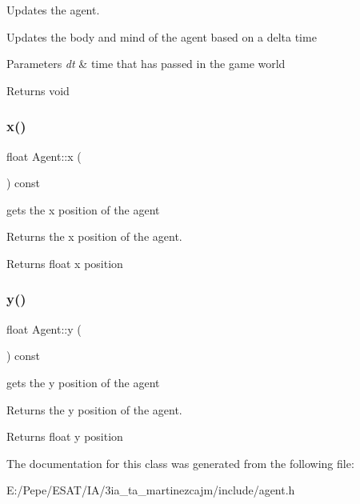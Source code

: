 Updates the agent. 

Updates the body and mind of the agent based on a delta time


\begin{DoxyParams}{Parameters}
{\em dt} & time that has passed in the game world \\
\hline
\end{DoxyParams}
\begin{DoxyReturn}{Returns}
void 
\end{DoxyReturn}
\mbox{\label{class_agent_a51aac7a6281e83d26d4c85475851cbf4}} 
\subsubsection{\texorpdfstring{x()}{x()}}
{\footnotesize\ttfamily float Agent\+::x (\begin{DoxyParamCaption}{ }\end{DoxyParamCaption}) const}



gets the x position of the agent 

Returns the x position of the agent.

\begin{DoxyReturn}{Returns}
float x position 
\end{DoxyReturn}
\mbox{\label{class_agent_a077acfc535e9ef3b0630beaa818627a4}} 
\subsubsection{\texorpdfstring{y()}{y()}}
{\footnotesize\ttfamily float Agent\+::y (\begin{DoxyParamCaption}{ }\end{DoxyParamCaption}) const}



gets the y position of the agent 

Returns the y position of the agent.

\begin{DoxyReturn}{Returns}
float y position 
\end{DoxyReturn}


The documentation for this class was generated from the following file\+:\begin{DoxyCompactItemize}
\item 
E\+:/\+Pepe/\+E\+S\+A\+T/\+I\+A/3ia\+\_\+ta\+\_\+martinezcajm/include/agent.\+h\end{DoxyCompactItemize}
